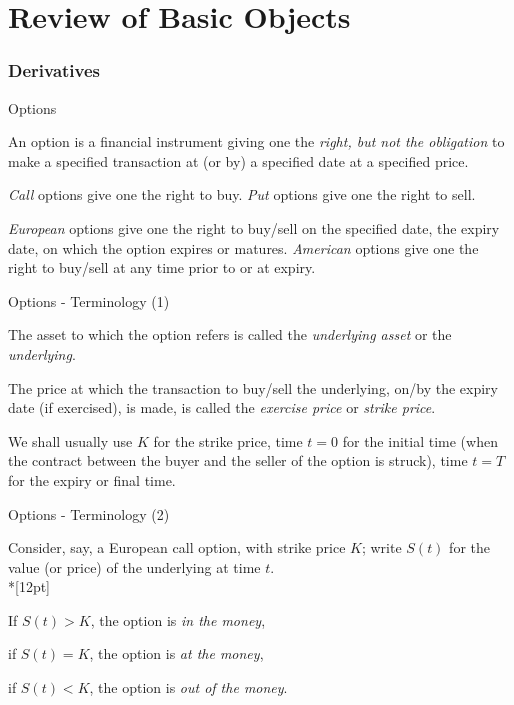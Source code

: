 
\part{Review of Basic Objects}

\section{Derivatives}

{Options}

 \item<1->  An option is a financial instrument giving one the {\it right, but
not the obligation} to make a specified transaction at (or by) a
specified date at a specified price.
\item<2->{\it Call} options give one
the right to buy. {\it Put} options give one the right to sell.
\item<3-> {\it European} options give one the right to buy/sell on the
specified date, the expiry date, on which the option expires or
matures. {\it American} options give one the right to buy/sell at any time
prior to or at expiry.

{Options - Terminology (1)}

\item<1-> The asset to which the option refers is called the {\it underlying
asset} or the {\it underlying}.
\item<2->
The price at which the transaction
to buy/sell the underlying, on/by the expiry date (if exercised),
is made, is called the {\it exercise price} or {\it strike price}.
\item<3-> We shall usually use $K$ for the strike price, time $t = 0$ for
the initial time (when the contract between the buyer and the
seller of the option is struck), time $t = T$ for the expiry or
final time.

{Options - Terminology (2)}

Consider, say, a European call option, with strike price $K$;
write $S(t)$ for the value (or price) of the underlying at time
$t$.\\*[12pt]
  \item<1-> If $S(t) > K$, the option is {\it in the money},
  \item<2-> if $S(t) = K$, the option is {\it at the money},
  \item<3-> if $S(t) < K$, the option is {\it out of the money}.

